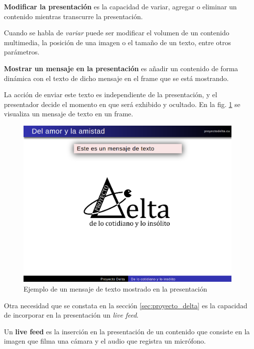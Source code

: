 		\begin{definition}
		\label{def:presentation_modification}
			\textbf{Modificar la presentación} es la capacidad de variar, agregar o eliminar un contenido mientras transcurre la presentación.
		\end{definition}

		Cuando se habla de \textit{variar} puede ser modificar el volumen de un contenido multimedia, la posición de una imagen o el tamaño de un texto, entre otros parámetros.


		\begin{definition}
		\label{def:message}
			\textbf{Mostrar un mensaje en la presentación} es añadir un contenido de forma dinámica con el texto de dicho mensaje en el frame que se está mostrando. 
		\end{definition}

		La acción de enviar este texto es independiente de la presentación, y el presentador decide el momento en que será exhibido y ocultado. En la fig. \ref{fig:msg} se visualiza un mensaje de texto en un frame.


		\begin{figure}[tb]
			\centering
			\includegraphics[width=12cm]{img/text_msg}
			\caption{Ejemplo de un mensaje de texto mostrado en la presentación}
			\label{fig:msg}
		\end{figure}

		Otra necesidad que se constata en la sección \ref{sec:proyecto_delta} es la capacidad de incorporar en la presentación un \textit{live feed}.

		\begin{definition}
		\label{def:live_feed}
			Un \textbf{live feed} es la inserción en la presentación de un contenido que consiste en la imagen que filma una cámara y el audio que registra un micrófono.
		\end{definition}

